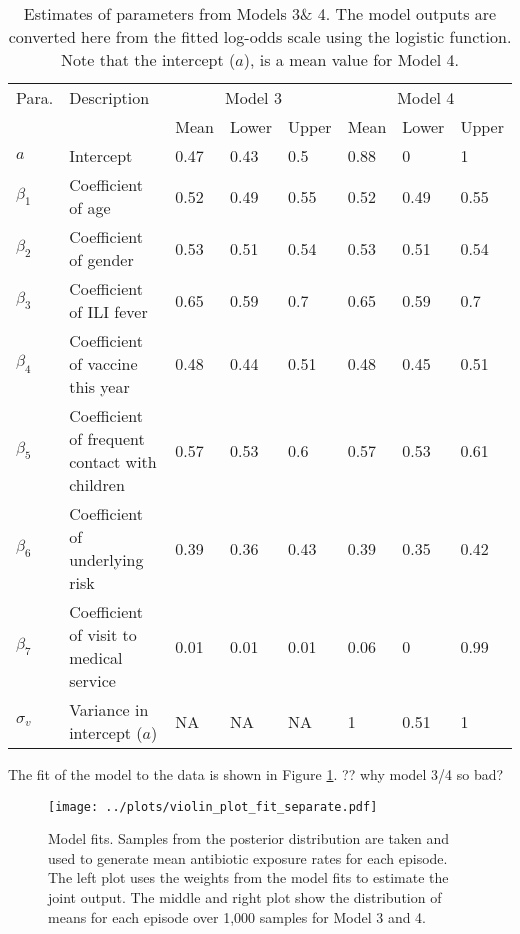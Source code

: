 \documentclass{article}
\begin{document}
\begin{table}[ht]
\centering
\begin{tabular}{|p{1cm}|p{6cm}|p{0.8cm}p{0.8cm}p{0.8cm}|p{0.8cm}p{0.8cm}p{0.8cm}|}
\hline
Para. & Description & \multicolumn{3}{|c|}{Model 3} & \multicolumn{3}{|c|}{Model 4} \\ 
 & & Mean & Lower & Upper & Mean & Lower & Upper \\
 \hline
$a$ & Intercept & 0.47 & 0.43 & 0.5 & 0.88 & 0 & 1 \\ 
  $\beta_1$ & Coefficient of age & 0.52 & 0.49 & 0.55 & 0.52 & 0.49 &0.55 \\ 
  $\beta_2$ & Coefficient of gender & 0.53 & 0.51 & 0.54 & 0.53 & 0.51 & 0.54 \\ 
  $\beta_3$ & Coefficient of ILI fever & 0.65 & 0.59 & 0.7 & 0.65 & 0.59 & 0.7 \\ 
  $\beta_4$ & Coefficient of vaccine this year & 0.48 & 0.44 & 0.51 & 0.48 & 0.45 & 0.51 \\ 
  $\beta_5$ & Coefficient of frequent contact with children & 0.57 & 0.53 & 0.6 & 0.57 & 0.53 & 0.61 \\ 
  $\beta_6$ & Coefficient of underlying risk & 0.39 & 0.36 & 0.43 & 0.39 & 0.35 & 0.42 \\ 
  $\beta_7$ & Coefficient of visit to medical service & 0.01 & 0.01 & 0.01 & 0.06 & 0 & 0.99 \\ 
  $\sigma_v$ & Variance in intercept ($a$) & NA & NA & NA & 1 & 0.51 & 1 \\ \hline
\end{tabular}
\caption{Estimates of parameters from Models 3\& 4. The model outputs are converted here from the fitted log-odds scale using the logistic function. Note that the intercept ($a$), is a mean value for Model 4.}
\label{tab:paraest}
\end{table}

The fit of the model to the data is shown in Figure \ref{fig:fit}. ?? why model 3/4 so bad?

\begin{figure}[htbp]
	\centering
	\texttt{[image: ../plots/violin\_plot\_fit\_separate.pdf]}
	\caption{Model fits. Samples from the posterior distribution are taken and used to generate mean antibiotic exposure rates for each episode. The left plot uses the weights from the model fits to estimate the joint output. The middle and right plot show the distribution of means for each episode over 1,000 samples for Model 3 and 4.}
	\label{fig:fit}
\end{figure}
\end{document}
